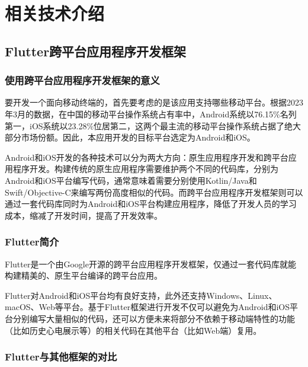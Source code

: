 

\chapter{相关技术介绍}\label{ch:tech}


\section{Flutter跨平台应用程序开发框架}\label{sec:flutter}

\subsection{使用跨平台应用程序开发框架的意义}\label{subsec:why-framework}

要开发一个面向移动终端的\app ，首先要考虑的是该应用支持哪些移动平台。根据2023年3月的数据\cite{MobileOperatingSystem}，在中国的移动平台操作系统占有率中，Android系统以76.15\%名列第一，iOS系统以23.28\%位居第二，这两个最主流的移动平台操作系统占据了绝大部分市场份额。因此，本应用开发的目标平台选定为Android和iOS。

Android和iOS开发的各种技术可以分为两大方向：原生应用程序开发和跨平台应用程序开发。构建传统的原生应用程序需要维护两个不同的代码库，分别为Android和iOS平台编写代码，通常意味着需要分别使用Kotlin/Java和Swift/Objective-C来编写两份高度相似的代码。而跨平台应用程序开发框架则可以通过一套代码库同时为Android和iOS平台构建应用程序，降低了开发人员的学习成本，缩减了开发时间，提高了开发效率。

\subsection{Flutter简介}\label{subsec:flutter}

Flutter是一个由Google开源的跨平台应用程序开发框架，仅通过一套代码库就能构建精美的、原生平台编译的跨平台应用\cite{FlutterBuildApps}。

Flutter对Android和iOS平台均有良好支持，此外还支持Windows、Linux、macOS、Web等平台\cite{SupportedDeploymentPlatforms}。基于Flutter框架进行开发不仅可以避免为Android和iOS平台分别编写大量相似的代码，还可以方便未来将部分不依赖于移动端特性的功能（比如历史心电展示等）的相关代码在其他平台（比如Web端）复用。

\subsection{Flutter与其他框架的对比}\label{subsec:flutter-compare}


